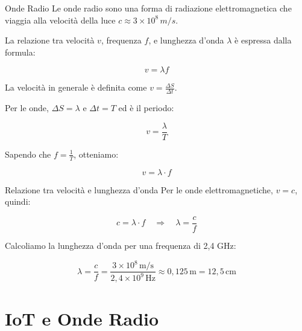 \documentclass{beamer}
\begin{document}
	
	\begin{frame}{Onde Radio}
		Le onde radio sono una forma di radiazione elettromagnetica che viaggia alla velocità della luce \( c \approx 3 \times 10^8 \, m/s \). 
	
		\vspace{0.3cm}
		La relazione tra velocità \( v \), frequenza \( f \), e lunghezza d'onda \( \lambda \) è espressa dalla formula:
	
	\[
	v = \lambda f
	\]
	
 	La velocità in generale è definita come \( v = \frac{\Delta S}{\Delta t} \).
	
	Per le onde, \( \Delta S = \lambda \) e \( \Delta t = T \) ed è il periodo:
	
	\[
	v = \frac{\lambda}{T}
	\]
	
	Sapendo che \( f = \frac{1}{T} \), otteniamo:
	
	\[
	v = \lambda \cdot f
	\]
	

	
\end{frame}
\begin{frame}{Relazione tra velocità e lunghezza d'onda}
	Per le onde elettromagnetiche, \( v = c \), quindi:
	
	\[
	c = \lambda \cdot f \quad \Rightarrow \quad \lambda = \frac{c}{f}
	\]

	\vspace{0.3cm}
	Calcoliamo la lunghezza d'onda per una frequenza di 2,4 GHz:
	
	\[
	\lambda =  \frac{c}{f} = \frac{3 \times 10^8 \, \text{m/s}}{2,4 \times 10^9 \, \text{Hz}} \approx 0,125 \, \text{m} = 12,5 \, \text{cm}
	\]

\end{frame}
	\section{IoT e Onde Radio}
	
\end{document}
